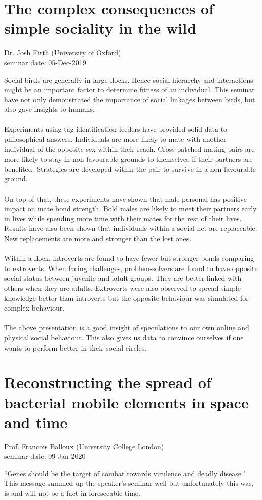 \documentclass{article}
\begin{document}
    \section{The complex consequences of simple sociality in the wild}
    \begin{flushright}
        \large{Dr. Josh Firth (University of Oxford)}\\
        seminar date: 05-Dec-2019
    \end{flushright}
    Social birds are generally in large flocks.  Hence social hierarchy and interactions might be an important factor to determine fitness of an individual.  This seminar have not only demonstrated the importance of social linkages between birds, but also gave insights to humans.\\\\
    Experiments using tag-identification feeders have provided solid data to philosophical answers.  Individuals are more likely to mate with another individual of the opposite sex within their reach.  Cross-patched mating pairs are more likely to stay in non-favourable grounds to themselves if their partners are benefited.  Strategies are developed within the pair to survive in a non-favourable ground.\\\\
    On top of that, these experiments have shown that male personal has positive impact on mate bond strength.  Bold males are likely to meet their partners early in lives while spending more time with their mates for the rest of their lives.  Results have also been shown that individuals within a social net are replaceable.  New replacements are more and stronger than the lost ones.\\\\
    Within a flock, introverts are found to have fewer but stronger bonds comparing to extroverts.  When facing challenges, problem-solvers are found to have opposite social status between juvenile and adult groups.  They are better linked with others when they are adults.  Extroverts were also observed to spread simple knowledge better than introverts but the opposite behaviour was simulated for complex behaviour.\\\\
    The above presentation is a good insight of speculations to our own online and physical social behaviour.  This also gives us data to convince ourselves if one wants to perform better in their social circles.
    \clearpage
    
    \section{Reconstructing the spread of bacterial mobile elements in space and time}
    \begin{flushright}
        \large{Prof. Francois Balloux (University College London)}\\
        seminar date: 09-Jan-2020
    \end{flushright}
    ``Genes should be the target of combat towards virulence and deadly disease."  This message summed up the speaker's seminar well but unfortunately this was, is and will not be a fact in foreseeable time.
    
\end{document}

